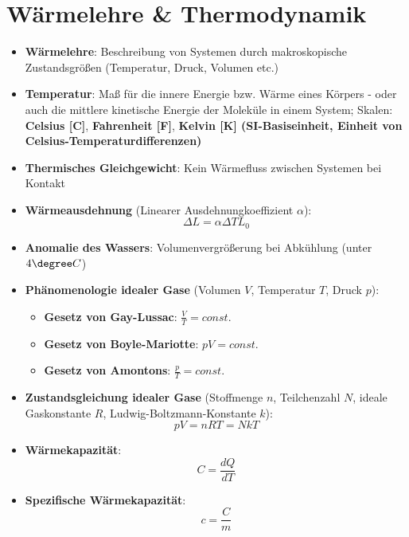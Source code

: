\section{Wärmelehre \& Thermodynamik}%
\label{sec:waermelehre_thermodynamik}

\begin{itemize}
	\item \textbf{Wärmelehre}: Beschreibung von Systemen durch makroskopische Zustandsgrößen (Temperatur, Druck, Volumen etc.)
	\item \textbf{Temperatur}: Maß für die innere Energie bzw. Wärme eines Körpers - oder auch die mittlere kinetische Energie der Moleküle in einem System; Skalen: \textbf{Celsius [\degree C]}, \textbf{Fahrenheit [\degree F]}, \textbf{Kelvin [K] (SI-Basiseinheit, Einheit von Celsius-Temperaturdifferenzen)}
	\item \textbf{Thermisches Gleichgewicht}: Kein Wärmefluss zwischen Systemen bei Kontakt
	\item \textbf{Wärmeausdehnung} (Linearer Ausdehnungkoeffizient $\alpha$):
	\begin{equation}
		\Delta L = \alpha \Delta T L_0
	\end{equation}
	\item \textbf{Anomalie des Wassers}: Volumenvergrößerung bei Abkühlung (unter $4\degree C$)
	\item \textbf{Phänomenologie idealer Gase} (Volumen $V$, Temperatur $T$, Druck $p$):
	\begin{itemize}
		\item \textbf{Gesetz von Gay-Lussac}: $\frac{V}{T} = const.$
		\item \textbf{Gesetz von Boyle-Mariotte}: $pV = const.$
		\item \textbf{Gesetz von Amontons}: $\frac{p}{T} = const.$
	\end{itemize}
	\item \textbf{Zustandsgleichung idealer Gase} (Stoffmenge $n$, Teilchenzahl $N$, ideale Gaskonstante $R$, Ludwig-Boltzmann-Konstante $k$):
	\begin{equation}
		pV = nRT = NkT
	\end{equation}
	\item \textbf{Wärmekapazität}:
	\begin{equation}
		C = \frac{dQ}{dT}
	\end{equation}
	\item \textbf{Spezifische Wärmekapazität}:
	\begin{equation}
		c = \frac{C}{m}
	\end{equation}

\end{itemize}
